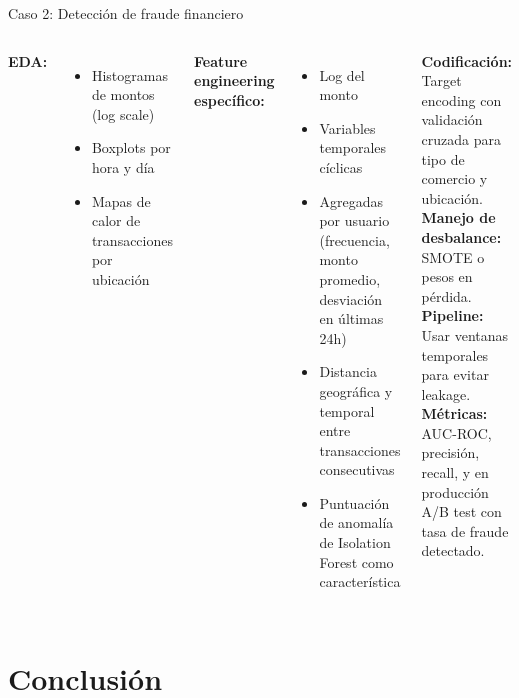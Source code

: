 \documentclass[aspectratio=169, 10pt, xcolor=table]{beamer}
\begin{document}
\begin{frame}{Caso 2: Detección de fraude financiero}
    \begin{columns}[t]
        \textbf{EDA:}
        \begin{itemize}
            \item Histogramas de montos (log scale)
            \item Boxplots por hora y día
            \item Mapas de calor de transacciones por ubicación
        \end{itemize}
        \textbf{Feature engineering específico:}
        \begin{itemize}
            \item Log del monto
            \item Variables temporales cíclicas
            \item Agregadas por usuario (frecuencia, monto promedio, desviación en últimas 24h)
            \item Distancia geográfica y temporal entre transacciones consecutivas
            \item Puntuación de anomalía de Isolation Forest como característica
        \end{itemize}
        \textbf{Codificación:} Target encoding con validación cruzada para tipo de comercio y ubicación. \\
        \textbf{Manejo de desbalance:} SMOTE o pesos en pérdida. \\
        \textbf{Pipeline:} Usar ventanas temporales para evitar leakage. \\
        \textbf{Métricas:} AUC-ROC, precisión, recall, y en producción A/B test con tasa de fraude detectado.
    \end{columns}
\end{frame}

\section{Conclusión}
\end{document}
